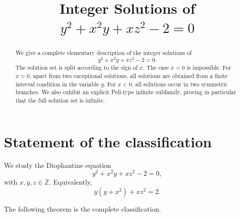 \documentclass[11pt]{article}
\title{Integer Solutions of \texorpdfstring{$y^2+x^2y+xz^2-2=0$}{y2+x2y+xz2-2=0}}
\author{}
\date{}
\theoremstyle{remark}
\newcommand{\Z}{\mathbb Z}
\begin{document}
\maketitle

\begin{abstract}
We give a complete elementary description of the integer solutions of
\[
        y^2+x^2y+xz^2-2=0.
\]
The solution set is split according to the sign of $x$.  The case $x=0$ is impossible.  For $x>0$, apart from two exceptional solutions, all solutions are obtained from a finite interval condition in the variable $y$.  For $x<0$, all solutions occur in two symmetric branches.  We also exhibit an explicit Pell-type infinite subfamily, proving in particular that the full solution set is infinite.
\end{abstract}

\section{Statement of the classification}

We study the Diophantine equation
\begin{equation}\label{eq:main}
        y^2+x^2y+xz^2-2=0,
\end{equation}
with $x,y,z\in\Z$.  Equivalently,
\begin{equation}\label{eq:factor-form}
        y(y+x^2)+xz^2=2.
\end{equation}

The following theorem is the complete classification.
\end{document}
